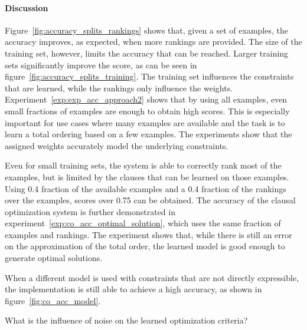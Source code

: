 \paragraph{Discussion}
Figure~\ref{fig:accuracy_splits_rankings} shows that, given a set of examples, the accuracy improves, as expected, when more rankings are provided.
The size of the training set, however, limits the accuracy that can be reached.
Larger training sets significantly improve the score, as can be seen in figure~\ref{fig:accuracy_splits_training}.
The training set influences the constraints that are learned, while the rankings only influence the weights.
Experiment~\ref{exp:exp_acc_approach2} shows that by using all examples, even small fractions of examples are enough to obtain high scores.
This is especially important for use cases where many examples are available and the task is to learn a total ordering based on a few examples.
The experiments show that the assigned weights accurately model the underlying constraints.

Even for small training sets, the system is able to correctly rank most of the examples, but is limited by the clauses that can be learned on those examples.
Using 0.4 fraction of the available examples and a 0.4 fraction of the rankings over the examples, scores over 0.75 can be obtained.
The accuracy of the clausal optimization system is further demonstrated in experiment~\ref{exp:co_acc_optimal_solution}, which uses the same fraction of examples and rankings.
The experiment shows that, while there is still an error on the approximation of the total order, the learned model is good enough to generate optimal solutions.

When a different model is used with constraints that are not directly expressible, the implementation is still able to achieve a high accuracy, as shown in figure~\ref{fig:co_acc_model}.

\begin{question}
	What is the influence of noise on the learned optimization criteria?
\end{question}

